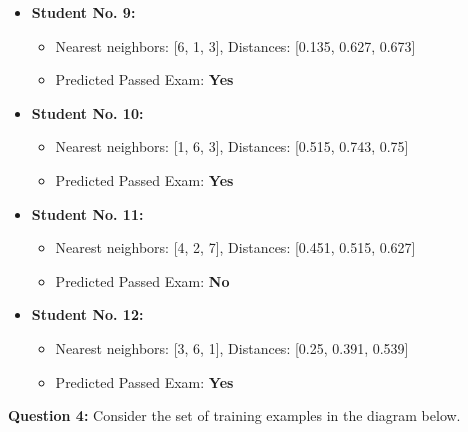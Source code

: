 \documentclass[a4paper,12pt]{article}
\begin{document}
\begin{itemize}
    \item \textbf{Student No. 9:}
    \begin{itemize}
        \item Nearest neighbors: [6, 1, 3], Distances: [0.135, 0.627, 0.673]
        \item Predicted Passed Exam: \textbf{Yes}
    \end{itemize}
    \item \textbf{Student No. 10:}
    \begin{itemize}
        \item Nearest neighbors: [1, 6, 3], Distances: [0.515, 0.743, 0.75]
        \item Predicted Passed Exam: \textbf{Yes}
    \end{itemize}
    \item \textbf{Student No. 11:}
    \begin{itemize}
        \item Nearest neighbors: [4, 2, 7], Distances: [0.451, 0.515, 0.627]
        \item Predicted Passed Exam: \textbf{No}
    \end{itemize}
    \item \textbf{Student No. 12:}
    \begin{itemize}
        \item Nearest neighbors: [3, 6, 1], Distances: [0.25, 0.391, 0.539]
        \item Predicted Passed Exam: \textbf{Yes}
    \end{itemize}
\end{itemize}
\newpage

\textbf{Question 4:} 
Consider the set of training examples in the diagram below.
\end{document}
